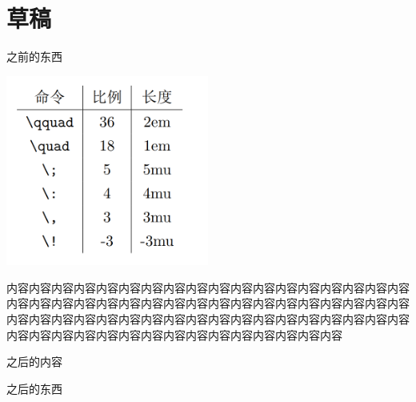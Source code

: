 \section{草稿}
之前的东西

\noindent\parbox{\textwidth}{
    \parbox{0.5\textwidth}{\includegraphics[width=0.5\textwidth]{pictures/spacing.png}}
    \parbox{0.5\textwidth}{
        内容内容内容内容内容内容内容内容内容内容内容内容内容内容内容内容内容内容内容内容内容内容内容内容内容内容内容内容内容内容内容内容内容内容内容内容内容内容内容内容内容内容内容内容内容内容内容内容内容内容内容内容内容内容内容内容内容内容内容内容内容内容内容内容内容内容内容内容内容
    }
}
之后的内容

之后的东西